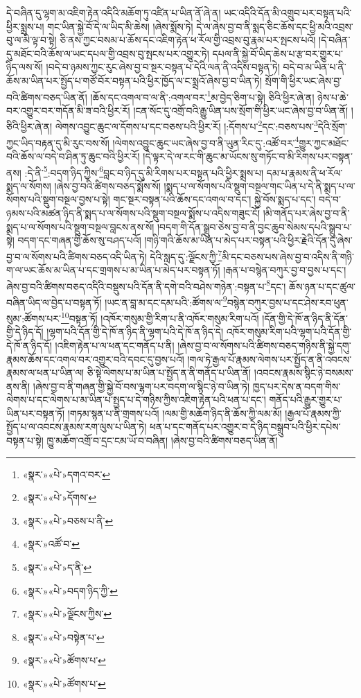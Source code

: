 དེ་བཞིན་དུ་ལྷག་མ་འཇིག་རྟེན་འདིའི་མཆོག་ཏུ་འཛིན་པ་ཡིན་ནོ་ཞེ་ན། ཡང་འདིའི་དོན་མི་འགྲུབ་པར་བསྟན་པའི་ཕྱིར་སྨྲས་པ། གང་ཡིན་སྐྱེ་བོ་དེ་ལ་ཡིད་མི་ཆེས། །ཞེས་སྨོས་ཏེ། དེ་ལ་ཞེས་བྱ་བ་ནི་སྨད་ཅིང་ཆོས་དང་ཕྱི་མའི་འབྲས་བུ་ལ་མི་ལྟ་བ་སྟེ། ཅི་ནས་ཀྱང་བསམ་པ་ཆོས་དང་འཇིག་རྟེན་ཕ་རོལ་གྱི་འབྲས་བུ་རྣམ་པར་སྤངས་པའོ། །དེ་བཞིན་དུ་མཐོང་བའི་ཆོས་ལ་ཡང་དཔལ་གྱི་འབྲས་བུ་སྤངས་པར་འགྱུར་ཏེ། དཔལ་ནི་སྐྱེ་བོ་ཡིད་ཆེས་པ་རྩ་བར་གྱུར་པ་ཉིད་ལས་སོ། །བདེ་བ་ཉམས་ཀྱང་རུང་ཞེས་བྱ་བ་སྔར་བསྟན་པ་དེའི་ལན་ནི་འདིས་བསྟན་ཏེ། བདེ་བ་མ་ཡིན་པ་ནི་ཆོས་མ་ཡིན་པར་སྤྱོད་པ་གཙོ་བོར་བསྟན་པའི་ཕྱིར་ཁྱོད་ལ་ང་སྨྲའོ་ཞེས་བྱ་བ་ཡིན་ཏེ། སྲོག་གི་ཕྱིར་ཡང་ཞེས་བྱ་བའི་ཚིགས་བཅད་ཡིན་ནོ། །ཆོས་དང་འགལ་བ་ལ་ནི་:འགལ་བར་\footnote{«སྣར་»«པེ་»དགའ་བར་}མ་བྱེད་ཅིག་པ་སྟེ། ཅིའི་ཕྱིར་ཞེ་ན། ཉེས་པ་ཆེ་བར་འགྱུར་བར་གདོན་མི་ཟ་བའི་ཕྱིར་རོ། །ངན་སོང་དུ་འགྲོ་བའི་རྒྱུ་ཡིན་པས་སྲོག་གི་ཕྱིར་ཡང་ཞེས་བྱ་བ་ཡིན་ནོ། །ཅིའི་ཕྱིར་ཞེ་ན། ལེགས་འབྱུང་ཆུང་ལ་དོགས་པ་དང་བཅས་པའི་ཕྱིར་རོ། །:དོགས་པ་\footnote{«སྣར་»«པེ་»དོགས་}དང་:བཅས་པས་\footnote{«སྣར་»«པེ་»བཅས་པ་ནི་}དེའི་སྲོག་ཀྱང་ཡིད་བརྟན་དུ་མི་རུང་བས་སོ། །ལེགས་འབྱུང་ཆུང་ཡང་ཞེས་བྱ་བ་ནི་ཡུན་རིང་དུ་:འཚོ་བར་\footnote{«སྣར་»འཚོ་བ་}གྱུར་ཀྱང་མཐོང་བའི་ཆོས་ལ་བདེ་བ་ཤིན་ཏུ་ཆུང་བའི་ཕྱིར་རོ། །དེ་ལྟར་དེ་ལ་རང་གི་ཆུང་མ་ཡོངས་སུ་གཏོང་བ་མི་རིགས་པར་བསྟན་ནས། :དེ་ནི་\footnote{«སྣར་»«པེ་»ད་ནི་}:བདག་ཉིད་ཀྱིས་\footnote{«སྣར་»«པེ་»བདག་ཉིད་ཀྱི་}བླང་བ་ཉིད་དུ་མི་རིགས་པར་བསྟན་པའི་ཕྱིར་སྨྲས་པ། དམ་པ་རྣམས་ནི་ཕ་རོལ་སྨད་ལ་སོགས། །ཞེས་བྱ་བའི་ཚིགས་བཅད་སྨོས་སོ། །སྨད་པ་ལ་སོགས་པའི་སྡུག་བསྔལ་གང་ཡིན་པ་དེ་ནི་སྨད་པ་ལ་སོགས་པའི་སྡུག་བསྔལ་བྱས་པ་སྟེ། གང་སྔར་བསྟན་པའི་ཆོས་དང་འགལ་བ་དང་། སྐྱེ་བོས་སྨད་པ་དང་། བདེ་བ་ཉམས་པའི་མཚན་ཉིད་ནི་སྨད་པ་ལ་སོགས་པའི་སྡུག་བསྔལ་སྨོས་པ་འདིས་གཟུང་ངོ། །མི་གནོད་པར་ཞེས་བྱ་བ་ནི་སྨད་པ་ལ་སོགས་པའི་སྡུག་བསྔལ་བླངས་ནས་སོ། །བདག་གི་དོན་སྒྲུབ་ཅེས་བྱ་བ་ནི་བྱང་ཆུབ་སེམས་དཔའི་སྒྲུབ་པ་སྟེ། བདག་དང་གཞན་གྱི་ཆོས་སུ་བཤད་པའོ། །གཉི་གའི་ཆོས་མ་ཡིན་པ་མེད་པར་བསྟན་པའི་ཕྱིར་རྗེའི་དོན་དུ་ཞེས་བྱ་བ་ལ་སོགས་པའི་ཚིགས་བཅད་འདི་ཡིན་ཏེ། དེའི་སླད་དུ་:ལྗོངས་ཀྱི་\footnote{«སྣར་»«པེ་»ལྗོངས་ཀྱིས་}མི་དང་བཅས་པས་ཞེས་བྱ་བ་འདིས་ནི་གཉི་ག་ལ་ཡང་ཆོས་མ་ཡིན་པ་དང་གྲགས་པ་མ་ཡིན་པ་མེད་པར་བསྟན་ཏོ། །རྒན་པ་བསྙེན་བཀུར་བྱ་བ་བྱས་པ་དང་། ཞེས་བྱ་བའི་ཚིགས་བཅད་འདིའི་བསྡུས་པའི་དོན་ནི་དགེ་བའི་བཤེས་གཉེན་:བསྟན་པ་\footnote{«སྣར་»«པེ་»བསྟེན་པ་}དང་། ཆོས་ཉན་པ་དང་ཚུལ་བཞིན་ཡིད་ལ་བྱེད་པ་བསྟན་ཏོ། །ཡང་ན་བླ་མ་དང་དམ་པའི་:ཚོགས་ལ་\footnote{«སྣར་»«པེ་»ཚོགས་པ་}བསྙེན་བཀུར་བྱས་པ་དང་ཤེས་རབ་ཕུན་སུམ་:ཚོགས་པར་\footnote{«སྣར་»«པེ་»ཚོགས་པ་}བསྟན་ཏོ། །འཁོར་གསུམ་གྱི་རིག་པ་ནི་འཁོར་གསུམ་རིག་པའོ། །དོན་གྱི་དེ་ཁོ་ན་ཉིད་ནི་དོན་གྱི་དེ་ཉིད་དོ། །ལྷག་པའི་དོན་གྱི་དེ་ཁོ་ན་ཉིད་ནི་ལྷག་པའི་དེ་ཁོ་ན་ཉིད་དེ། འཁོར་གསུམ་རིག་པའི་ལྷག་པའི་དོན་གྱི་དེ་ཁོ་ན་ཉིད་དོ། །འཇིག་རྟེན་པ་ལ་ཕན་དང་གནོད་པ་ནི། །ཞེས་བྱ་བ་ལ་སོགས་པའི་ཚིགས་བཅད་གཉིས་ནི་སྐྱེ་དགུ་རྣམས་ཆོས་དང་འགལ་བར་འགྱུར་བའི་དབང་དུ་བྱས་པའོ། །གལ་ཏེ་རྒྱལ་པོ་རྣམས་ལེགས་པར་སྤྱོད་ན་ནི་འབངས་རྣམས་ལ་ཕན་པ་ཡིན་ལ། ཅི་སྟེ་ལེགས་པ་མ་ཡིན་པ་སྤྱོད་ན་ནི་གནོད་པ་ཡིན་ནོ། །འབངས་རྣམས་སྙིང་ཉེ་བསམས་ནས་ནི། །ཞེས་བྱ་བ་ནི་གཞན་གྱི་སྐྱེ་བོ་བས་ལྷག་པར་བདག་ལ་སྙིང་ཉེ་བ་ཡིན་ཏེ། ཁྱད་པར་དེས་ན་བདག་གིས་ལེགས་པ་དང་ལེགས་པ་མ་ཡིན་པ་སྤྱད་པ་དེ་གཉིས་ཀྱིས་འཇིག་རྟེན་པའི་ཕན་པ་དང་། གནོད་པའི་རྒྱུར་གྱུར་པ་ཡིན་པར་བསྟན་ཏོ། །གཏམ་སྙན་པ་ནི་གྲགས་པའོ། །ལམ་གྱི་མཆོག་ཉིད་ནི་ཆོས་ཀྱི་ལམ་མོ། །རྒྱལ་པོ་རྣམས་ཀྱི་སྤྱོད་པ་ལ་འབངས་རྣམས་རག་ལུས་པ་ཡིན་ཏེ། ཕན་པ་དང་གནོད་པར་འགྱུར་བ་དེ་ཉིད་བསྒྲུབ་པའི་ཕྱིར་དཔེས་བསྟན་པ་སྟེ། ཁྱུ་མཆོག་འགྲོ་བ་དྲང་ངམ་ཡོ་བ་བཞིན། །ཞེས་བྱ་བའི་ཚིགས་བཅད་ཡིན་ནོ། 